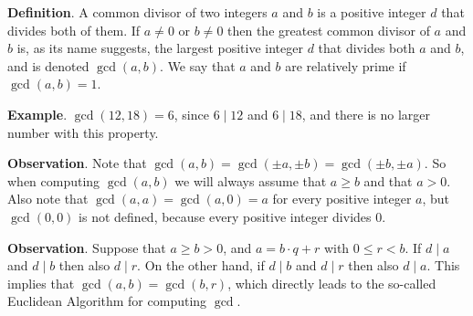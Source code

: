 \documentclass[10pt,varwidth=6in,margin=0.2in,preview]{standalone}
\begin{document}
\begin{flushleft}

\textbf{Definition}. A common divisor of two integers $a$ and $b$ is a positive integer $d$ that divides both of them. If $a \neq 0$ or $b \neq 0$ then the greatest common divisor of $a$ and $b$ is, as its name suggests, the largest positive integer $d$ that divides both $a$ and $b$, and is denoted $\gcd(a, b)$. We say that $a$ and $b$ are relatively prime if $\gcd(a, b) = 1$.

\textbf{Example}. $\gcd(12, 18) = 6$, since $6 \mid 12$ and $6 \mid 18$, and there is no larger number with this property.

\textbf{Observation}. Note that $\gcd(a, b) = \gcd(\pm a, \pm b) = \gcd(\pm b, \pm a)$. So when computing $\gcd(a, b)$ we will always assume that $a \ge b$ and that $a > 0$. Also note that $\gcd(a, a) = \gcd(a, 0) = a$ for every positive integer $a$, but $\gcd(0, 0)$ is not defined, because every positive integer divides $0$.

\textbf{Observation}. Suppose that $a \ge b > 0$, and $a = b \cdot q + r$ with $0 \le r < b$. If $d \mid a$ and $d \mid b$ then also $d \mid r$. On the other hand, if $d \mid b$ and $d \mid r$ then also $d \mid a$. This implies that $\gcd(a, b) = \gcd(b, r)$, which directly leads to the so-called Euclidean Algorithm for computing $\gcd$.


\end{flushleft}
\end{document}

